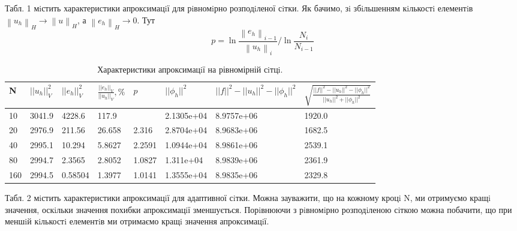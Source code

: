 \documentclass[a4paper]{article}
\newcommand\norm[1]{\left\lVert#1\right\rVert}
\numberwithin{equation}{section}
\begin{document}
Табл. 1 мiстить характеристики апроксимацiї для рiвномiрно розподiленої сiтки. Як бачимо, зi збiльшенням кiлькостi елементiв $\norm{u_h}_H \to \norm{u}_H$, а $\norm{e_h}_H \to 0$. Тут
\begin{equation}
p=\ln{\frac{\norm{e_h}_{i-1}}{\norm{u_h}_i}}/\ln{\frac{N_i}{N_{i-1}}}
\end{equation}

\begin{table}[H]
\centering
\begin{tabular}{|l|l|l|l|l|l|l|l|}
\hline
N   & $ ||u_h||_V^2 $ & $ ||e_h||_V^2 $ & $ \frac{||e_h||_V}{||u_h||_V}, \% $ & $ p $ & $ ||\phi_h||^2 $ & $ ||f||^2 - ||u_h||^2 - ||\phi_h||^2 $ & $ \sqrt{\frac{||f||^2 - ||u_h||^2 - ||\phi_h||^2}{||u_h||^2 + ||\phi_h||^2}} $ \\ \hline
10 & 3041.9 & 4228.6 & 117.9 &  & 2.1305e+04 & 8.9757e+06 & 1920.0 \\ \hline
20 & 2976.9 & 211.56 & 26.658 & 2.316 & 2.8704e+04 & 8.9683e+06 & 1682.5 \\ \hline
40 & 2995.1 & 10.294 & 5.8627 & 2.2591 & 1.0944e+04 & 8.9861e+06 & 2539.1 \\ \hline
80 & 2994.7 & 2.3565 & 2.8052 & 1.0827 & 1.311e+04 & 8.9839e+06 & 2361.9 \\ \hline
160 & 2994.5 & 0.58504 & 1.3977 & 1.0141 & 1.3555e+04 & 8.9835e+06 & 2329.8 \\ \hline

\end{tabular}
\caption{Характеристики апроксимацiї на рівномірній сiтцi.}
\end{table}

Табл. 2 мiстить характеристики апроксимацiї для адаптивної сiтки. Можна зауважити, що на кожному кроцi N, ми отримуємо кращi значення, оскiльки значення похибки апроксимацiї зменшу\-ється. Порiвнюючи з рiвномiрно розподiленою сiткою можна побачити, що при меншiй кiлькостi елементiв ми отримаємо кращi значення апроксимацiї.
\end{document}
